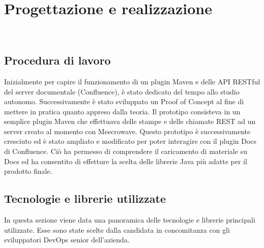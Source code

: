 
\chapter{Progettazione e realizzazione} %
\label{cap:progettazione}

\\

\section{Procedura di lavoro}
Inizialmente per capire il funzionamento di un plugin Maven e delle API RESTful del server documentale (Confluence), è stato dedicato del tempo allo studio autonomo.
Successivamente è stato sviluppato un Proof of Concept al fine di mettere in pratica quanto appreso dalla teoria.
Il prototipo consisteva in un semplice plugin Maven che effettuava delle stampe e delle chiamate REST ad un server creato al momento con Meecrowave.
Questo prototipo è successivamente cresciuto ed è stato ampliato e modificato per poter interagire con il plugin Docs di Confluence.
Ciò ha permesso di comprendere il caricamento di materiale su Docs ed ha consentito di effetture la scelta delle librerie Java più adatte per il prodotto finale.


\section{Tecnologie e librerie utilizzate}
\label{sec:tecnologie-strumenti}

In questa sezione viene data una panoramica delle tecnologie e librerie principali utilizzate.
Esse sono state scelte dalla candidata in concomitanza con gli sviluppatori DevOps senior dell'azienda.


